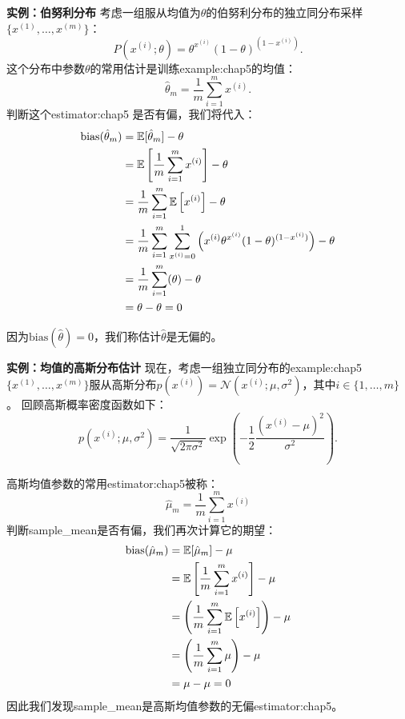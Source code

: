 \textbf{实例：伯努利分布}\quad 
考虑一组服从均值为$\theta$的伯努利分布的独立同分布采样$\{x^{(1)}, \dots , x^{(m)}\}$：
\begin{equation}
    P(x^{(i)}; \theta) = \theta^{x^{(i)}} (1-\theta)^{(1 - x^{(i)})}.
\end{equation}
这个分布中参数$\theta$的常用估计是训练\gls{example:chap5}的均值：
\begin{equation}
\label{eq:5.22}
    \hat{\theta}_m = \frac{1}{m} \sum_{i=1}^m x^{(i)}.
\end{equation}
判断这个\gls{estimator:chap5} 是否有偏，我们将代入：
\begin{align}
    \text{bias}(\hat{\theta}_m)     &= \mathbb{E}[\hat{\theta}_m] - \theta  \\
            &= \mathbb{E} \left[ \frac{1}{m} \sum_{i=1}^m x^{(i)} \right] - \theta \\
            &= \frac{1}{m} \sum_{i=1}^m \mathbb{E} \left[x^{(i)} \right] - \theta \\
            &= \frac{1}{m} \sum_{i=1}^m \sum_{x^{(i)} = 0}^1 \left( x^{(i)} \theta^{x^{(i)}} (1-\theta)^{(1-x^{(i)})} \right) - \theta \\
            &= \frac{1}{m} \sum_{i=1}^m (\theta) - \theta \\
            &= \theta - \theta = 0
\end{align}

因为$\text{bias}(\hat{\theta})=0$，我们称估计$\hat{\theta}$是无偏的。

\textbf{实例：均值的高斯分布估计}\quad 
现在，考虑一组独立同分布的\gls{example:chap5}$\{x^{(1)}, \dots , x^{(m)}\}$服从高斯分布$p(x^{(i)}) = \mathcal{N}(x^{(i)}; \mu, \sigma^2)$，其中$i\in\{1, \dots, m\}$。
回顾高斯概率密度函数如下：
\begin{equation}
    p(x^{(i)}; \mu, \sigma^2) = \frac{1}{\sqrt{2\pi\sigma^2}} \exp\left( -\frac{1}{2} \frac{(x^{(i)} - \mu)^2}{\sigma^2}  \right).
\end{equation}

高斯均值参数的常用\gls{estimator:chap5}被称：
\begin{equation}
    \hat{\mu}_m = \frac{1}{m} \sum_{i=1}^m x^{(i)}
\end{equation}
判断\gls{sample_mean}是否有偏，我们再次计算它的期望：
\begin{align}
\text{bias} (\hat{\mu}_m) &= \mathbb{E}[ \hat{\mu}_m ]  - \mu \\
    &= \mathbb{E} \left[ \frac{1}{m} \sum_{i=1}^m x^{(i)}  \right] - \mu \\
    &= \left( \frac{1}{m}\sum_{i=1}^m \mathbb{E} \left[ x^{(i)} \right] \right) - \mu \\
    &= \left( \frac{1}{m}\sum_{i=1}^m \mu \right) - \mu \\
    &= \mu - \mu = 0
\end{align}
因此我们发现\gls{sample_mean}是高斯均值参数的无偏\gls{estimator:chap5}。

